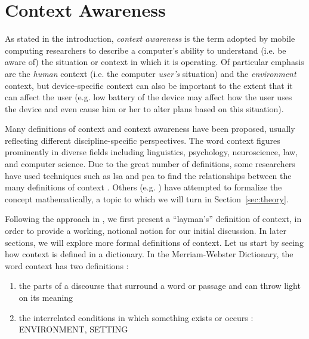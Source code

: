 \chapter{Context Awareness}
\label{ch:context_awareness}

As stated in the introduction, \emph{context awareness} is the term adopted by mobile computing researchers to describe a computer's ability to understand (i.e. be aware of) the situation or context in which it is operating. Of particular emphasis are the \emph{human} context (i.e. the computer \emph{user's} situation) and the \emph{environment} context, but device-specific context can also be important to the extent that it can affect the user (e.g. low battery of the device may affect how the user uses the device and even cause him or her to alter plans based on this situation).

Many definitions of context and context awareness have been proposed, usually reflecting different discipline-specific perspectives. The word context figures prominently in diverse fields including linguistics, psychology, neuroscience, law, and computer science. Due to the great number of definitions, some researchers have used techniques such as \gls{lsa} and \gls{pca} to find the relationships between the many definitions of context \cite{Foltz1998} \cite{Bazire2005}. Others (e.g. \cite{McCarthy1993}) have attempted to formalize the concept mathematically, a topic to which we will turn in Section~\ref{sec:theory}.

Following the approach in \cite{chen_geospatial_2014}, we first present a ``layman's'' definition of context, in order to provide a working, notional notion for our initial discussion. In later sections, we will explore more formal definitions of context. Let us start by seeing how context is defined in a dictionary. In the Merriam-Webster Dictionary, the word context has two definitions \cite{merriam2015}:

\begin{enumerate}
  \item the parts of a discourse that surround a word or passage and can throw light on its meaning
  \item the interrelated conditions in which something exists or occurs : ENVIRONMENT, SETTING
\end{enumerate}


